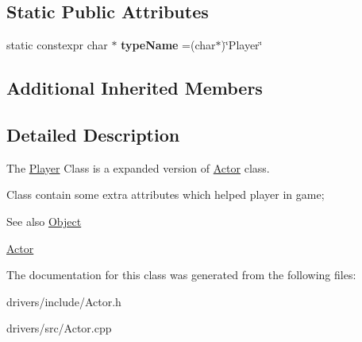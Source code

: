\subsection*{Static Public Attributes}
\begin{DoxyCompactItemize}
\item 
\hypertarget{classPlayer_a0b125b1e2117688adffc2e89db2fb53a}{}static constexpr char $\ast$ {\bfseries type\+Name} =(char$\ast$)\char`\"{}Player\char`\"{}\label{classPlayer_a0b125b1e2117688adffc2e89db2fb53a}

\end{DoxyCompactItemize}
\subsection*{Additional Inherited Members}


\subsection{Detailed Description}
The \hyperlink{classPlayer}{Player} Class is a expanded version of \hyperlink{classActor}{Actor} class. 

Class contain some extra attributes which helped player in game;

\begin{DoxySeeAlso}{See also}
\hyperlink{classObject}{Object} 

\hyperlink{classActor}{Actor} 
\end{DoxySeeAlso}


The documentation for this class was generated from the following files\+:\begin{DoxyCompactItemize}
\item 
drivers/include/Actor.\+h\item 
drivers/src/Actor.\+cpp\end{DoxyCompactItemize}
